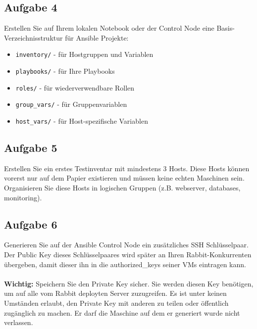\documentclass{article}
\begin{document}
    \subsection{Aufgabe 4}
    Erstellen Sie auf Ihrem lokalen Notebook oder der Control Node eine Basis-Verzeichnisstruktur für Ansible Projekte:
    \begin{itemize}
        \item \texttt{inventory/} - für Hostgruppen und Variablen
        \item \texttt{playbooks/} - für Ihre Playbooks
        \item \texttt{roles/} - für wiederverwendbare Rollen
        \item \texttt{group\_vars/} - für Gruppenvariablen
        \item \texttt{host\_vars/} - für Host-spezifische Variablen
    \end{itemize}

    \subsection{Aufgabe 5}
    Erstellen Sie ein erstes Testinventar mit mindestens 3 Hosts.
    Diese Hosts können vorerst nur auf dem Papier existieren und müssen keine echten Maschinen sein.
    Organisieren Sie diese Hosts in logischen Gruppen (z.B. webserver, databases, monitoring).

    \subsection{Aufgabe 6}
    Generieren Sie auf der Ansible Control Node ein zusätzliches SSH Schlüsselpaar.
    Der Public Key dieses Schlüsselpaares wird später an Ihren Rabbit-Konkurrenten übergeben, damit dieser ihn in die authorized\_keys seiner VMs eintragen kann.
    \\ \\
    \textbf{Wichtig:} Speichern Sie den Private Key sicher. Sie werden diesen Key benötigen, um auf alle vom Rabbit deployten Server zuzugreifen.
    Es ist unter keinen Umständen erlaubt, den Private Key mit anderen zu teilen oder öffentlich zugänglich zu machen.
    Er darf die Maschine auf dem er generiert wurde nicht verlassen.
\end{document}
